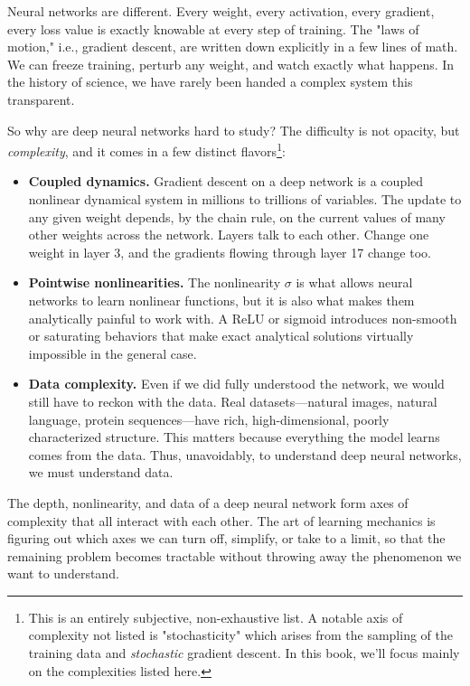 Neural networks are different. Every weight, every activation, every gradient, every loss value is exactly knowable at every step of training. The "laws of motion," i.e., gradient descent, are written down explicitly in a few lines of math. We can freeze training, perturb any weight, and watch exactly what happens. In the history of science, we have rarely been handed a complex system this transparent.

So why are deep neural networks hard to study? The difficulty is not opacity, but \textit{complexity}, and it comes in a few distinct flavors\footnote{This is an entirely subjective, non-exhaustive list. A notable axis of complexity not listed is "stochasticity" which arises from the sampling of the training data and \textit{stochastic} gradient descent. In this book, we'll focus mainly on the complexities listed here.}:

\begin{itemize}

    \item \textbf{Coupled dynamics.} Gradient descent on a deep network is a coupled nonlinear dynamical system in millions to trillions of variables. The update to any given weight depends, by the chain rule, on the current values of many other weights across the network. Layers talk to each other. Change one weight in layer 3, and the gradients flowing through layer 17 change too.
    
    \item \textbf{Pointwise nonlinearities.} The nonlinearity $\sigma$ is what allows neural networks to learn nonlinear functions, but it is also what makes them analytically painful to work with. A ReLU or sigmoid introduces non-smooth or saturating behaviors that make exact analytical solutions virtually impossible in the general case.
    
    \item \textbf{Data complexity.} Even if we did fully understood the network, we would still have to reckon with the data. Real datasets---natural images, natural language, protein sequences---have rich, high-dimensional, poorly characterized structure. This matters because everything the model learns comes from the data. Thus, unavoidably, to understand deep neural networks, we must understand data.
\end{itemize}

The depth, nonlinearity, and data of a deep neural network form axes of complexity that all interact with each other. The art of learning mechanics is figuring out which axes we can turn off, simplify, or take to a limit, so that the remaining problem becomes tractable without throwing away the phenomenon we want to understand.

